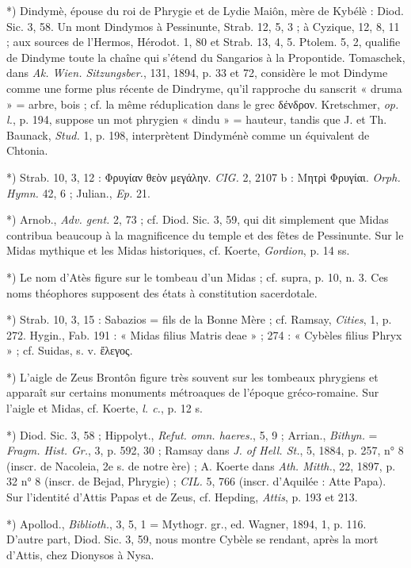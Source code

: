 \documentclass[a4paper, 11pt, oneside, polutonikogreek, french]{article}
\begin{document}
*) Dindymè, épouse du roi de Phrygie et de Lydie Maiôn, mère de Kybélè : Diod. Sic. 3, 58. Un mont Dindymos à Pessinunte, Strab. 12, 5, 3 ; à Cyzique, 12, 8, 11 ; aux sources de l'Hermos, Hérodot. 1, 80 et Strab. 13, 4, 5. Ptolem. 5, 2, qualifie de Dindyme toute la chaîne qui s'étend du Sangarios à la Propontide. Tomaschek, dans \emph{Ak. Wien. Sitzungsber.}, 131, 1894, p. 33 et 72, considère le mot Dindyme comme une forme plus récente de Dindryme, qu'il rapproche du sanscrit « druma » = arbre, bois ; cf. la même réduplication dans le grec δένδρον. Kretschmer, \emph{op. l.}, p. 194, suppose un mot phrygien « dindu » = hauteur, tandis que J. et Th. Baunack, \emph{Stud.} 1, p. 198, interprètent Dindyménè comme un équivalent de Chtonia.

*) Strab. 10, 3, 12 : Φρυγίαν θεὸν μεγάλην. \emph{CIG.} 2, 2107 b : Μητρὶ Φρυγίαι. \emph{Orph. Hymn.} 42, 6 ; Julian., \emph{Ep.} 21.

*) Arnob., \emph{Adv. gent.} 2, 73 ; cf. Diod. Sic. 3, 59, qui dit simplement que Midas contribua beaucoup à la magnificence du temple et des fêtes de Pessinunte. Sur le Midas mythique et les Midas historiques, cf. Koerte, \emph{Gordion}, p. 14 ss.

*) Le nom d'Atès figure sur le tombeau d'un Midas ; cf. supra, p. 10, n. 3. Ces noms théophores supposent des états à constitution sacerdotale.

*) Strab. 10, 3, 15 : Sabazios = fils de la Bonne Mère ; cf. Ramsay, \emph{Cities}, 1, p. 272. Hygin., Fab. 191 : « Midas filius Matris deae » ; 274 : « Cybèles filius Phryx » ; cf. Suidas, s. v. ἔλεγος.

*) L'aigle de Zeus Brontôn figure très souvent sur les tombeaux phrygiens et apparaît sur certains monuments métroaques de l'époque gréco-romaine. Sur l'aigle et Midas, cf. Koerte, \emph{l. c.}, p. 12 s.

*) Diod. Sic. 3, 58 ; Hippolyt., \emph{Refut. omn. haeres.}, 5, 9 ; Arrian., \emph{Bithyn.} = \emph{Fragm. Hist. Gr.}, 3, p. 592, 30 ; Ramsay dans \emph{J. of Hell. St.}, 5, 1884, p. 257, n° 8 (inscr. de Nacoleia, 2e s. de notre ère) ; A. Koerte dans \emph{Ath. Mitth.}, 22, 1897, p. 32 n° 8 (inscr. de Bejad, Phrygie) ; \emph{CIL.} 5, 766 (inscr. d'Aquilée : Atte Papa). Sur l'identité d'Attis Papas et de Zeus, cf. Hepding, \emph{Attis}, p. 193 et 213.

*) Apollod., \emph{Biblioth.}, 3, 5, 1 = Mythogr. gr., ed. Wagner, 1894, 1, p. 116. D'autre part, Diod. Sic. 3, 59, nous montre Cybèle se rendant, après la mort d'Attis, chez Dionysos à Nysa.
\end{document}

